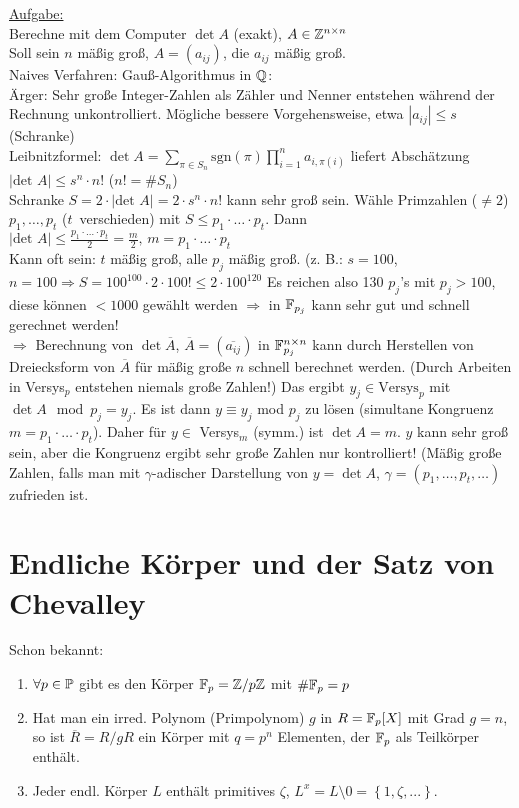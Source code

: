 \documentclass[a4paper,twoside,DIV15,BCOR12mm]{scrbook}
\begin{document}
\underline{Aufgabe:} \\
Berechne mit dem Computer $\det A$ (exakt), $A \in \mathbb{Z}^{n \times n}$ \\
Soll sein $n$ mäßig groß, $A=(a_{ij})$, die $a_{ij}$ mäßig groß.\\
Naives Verfahren: Gauß-Algorithmus in $\mathbb{Q}$: \\
Ärger: Sehr große Integer-Zahlen als Zähler und Nenner entstehen während
der Rechnung unkontrolliert. Mögliche bessere Vorgehensweise, etwa $|a_{ij}| \leq s$
(Schranke) \\
Leibnitzformel: $\det A=\sum_{\pi \in
S_n}\text{sgn}(\pi)\prod_{i=1}^na_{i,\pi(i)}$
liefert Abschätzung $|\mbox{det }A|\leq s^n\cdot n!$ (${n! = \#S_n}$)\\
Schranke $S = 2\cdot|\mbox{det }A| = 2 \cdot s^n\cdot n!$ kann sehr
groß sein. Wähle Primzahlen ($\neq 2$) $p_1,\dotsc,p_t$
($t$~verschieden) mit $S \leq p_1\cdot \dotsc \cdot p_t$. Dann
$|\mbox{det }A| \leq \frac{p_1\cdot \dotsc \cdot p_t}{2} = \frac{m}{2}\mbox{, }m=p_1\cdot \dotsc \cdot p_t$\\
Kann oft sein: $t$ mäßig groß, alle $p_j$ mäßig groß. (z. B.:
$s=100$, $n=100 \Rightarrow S = 100^{100}\cdot 2 \cdot 100! \leq 2 \cdot 100^{120}$
Es reichen also 130 $p_j$'s mit $p_j > 100$, diese können $< 1000$ gewählt werden
$\Rightarrow$ in $\mathbb{F}_{p_j}$ kann sehr gut und schnell gerechnet werden!\\
$\Rightarrow$ Berechnung von $\det \overline{A}$, $\overline{A} =
(\overline{a_{ij}})$ in $\mathbb{F}_{p_j}^{n \times n}$ kann durch
Herstellen von Dreiecksform von $\overline{A}$ für mäßig große $n$
schnell berechnet werden. (Durch Arbeiten in Versys$_p$ entstehen
niemals große Zahlen!) Das ergibt $y_j \in \mbox{Versys}_p$ mit
$\det A \mod p_j = y_j$. Es ist dann $y \equiv y_j$ mod $p_j$ zu
lösen (simultane Kongruenz $m=p_1\cdot \dotsc \cdot p_t$). Daher für
$y \in$ Versys$_m$ (symm.) ist $\det A=m$. $y$ kann sehr groß sein,
aber die Kongruenz ergibt sehr große Zahlen nur kontrolliert! (Mäßig
große Zahlen, falls man mit $\gamma$-adischer Darstellung von
$y=\det A$, $\gamma=(p_1,\dotsc,p_t,\dotsc)$ zufrieden ist.


\chapter{Endliche Körper und der Satz von Chevalley}

Schon bekannt:
\begin{enumerate}
\item $\forall p \in \mathbb{P}$ gibt es den Körper $\mathbb{F}_p = \mathbb{Z}/p\mathbb{Z}$ mit $\#\mathbb{F}_p=p$
\item Hat man ein irred. Polynom (Primpolynom) $g$ in $R = \mathbb{F}_p[X]$ mit Grad $g = n$, so ist $\overline R = R/gR$ ein Körper mit $q=p^n$ Elementen, der $\mathbb{F}_p$ als Teilkörper enthält.
\item Jeder endl. Körper $L$ enthält primitives $\zeta$, $L^x = L\setminus 0 = \left\{1,\zeta,...\right\}$.
\end{enumerate}
\end{document}
